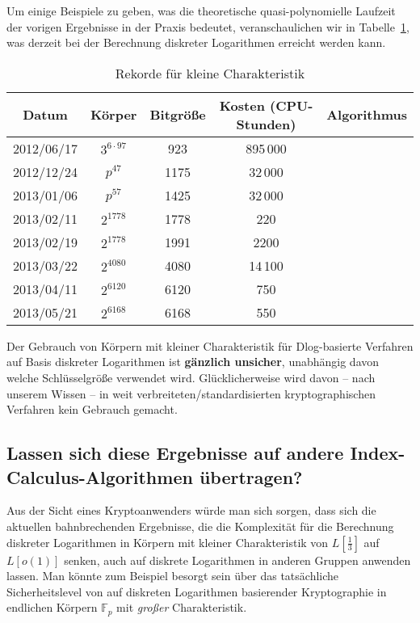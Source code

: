 \begin{refsegment}
Um einige Beispiele zu geben, was die theoretische quasi-polynomielle Laufzeit der vorigen Ergebnisse in der Praxis bedeutet, veranschaulichen wir in Tabelle~\ref{dlog-table}, was derzeit bei der Berechnung diskreter Logarithmen erreicht werden kann.

\begin{table}[h]
\begin{center}
\begin{tabular}{ccccc}
Datum & Körper & Bitgröße & Kosten (CPU-Stunden) & Algorithmus\\
\hline
 2012/06/17&$3^{6\cdot 97}$ & 923 & 895\,000 & \cite{JL2006}\\
2012/12/24&$p^{47}$ & 1175 & 32\,000 & \cite{Pin2013}\\
2013/01/06&$p^{57}$ & 1425 & 32\,000 & \cite{Pin2013}\\
2013/02/11 &$2^{1778}$ & 1778 & 220 & \cite{Joux2013}\\
2013/02/19 &$2^{1778}$ & 1991 & 2200 & \cite{GGMZ2013}\\
2013/03/22 &$2^{4080}$& 4080 & 14\,100 & \cite{Joux2013}\\
2013/04/11&$2^{6120}$ & 6120 & 750 & \cite{Joux2013}\\
2013/05/21&$2^{6168}$ & 6168 & 550 & \cite{Joux2013}\\
\hline
\end{tabular}
\caption{Rekorde für kleine Charakteristik}
\label{dlog-table}
\end{center}
\end{table}

Der Gebrauch von Körpern mit kleiner Charakteristik für Dlog-basierte Verfahren auf Basis diskreter Logarithmen ist {\bf gänzlich unsicher}, unabhängig davon welche Schlüsselgröße verwendet wird. Glücklicherweise wird davon -- nach unserem Wissen -- in weit verbreiteten/standardisierten kryptographischen Verfahren kein Gebrauch gemacht.



\subsection{Lassen sich diese Ergebnisse auf andere Index-Calculus-Algorithmen übertragen?}

Aus der Sicht eines Kryptoanwenders würde man sich sorgen, dass sich die aktuellen bahnbrechenden Ergebnisse, die die Komplexität für die Berechnung diskreter Logarithmen in Körpern mit kleiner Charakteristik von $L[\frac 1 3]$ auf $L[o(1)]$ senken, auch auf diskrete Logarithmen in anderen Gruppen anwenden lassen. Man könnte zum Beispiel besorgt sein über das tatsächliche Sicherheitslevel von auf diskreten Logarithmen basierender Kryptographie in endlichen Körpern $\mathbb{F}_p$ mit {\em großer} Charakteristik.\\[0.1cm]


\end{refsegment}
